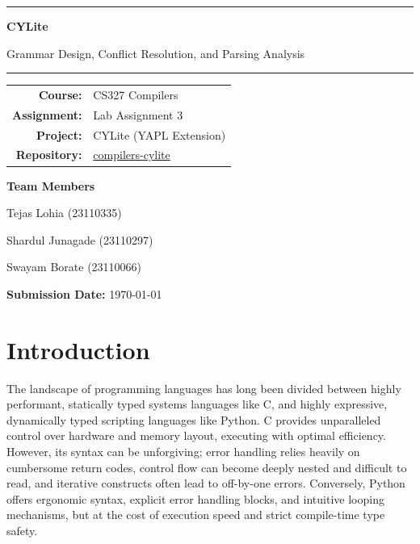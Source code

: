 \documentclass[a4paper,12pt]{article}
\begin{document}
\begin{titlepage}
    \centering
    \vspace*{1.2cm}

    \vspace{0.9cm}
    \rule{0.9\textwidth}{0.8pt}
    \vspace{0.6cm}

    {\Huge \textbf{CYLite} \par}
    \vspace{0.45cm}
    {\LARGE Grammar Design, Conflict Resolution, and Parsing Analysis \par}
    \vspace{0.6cm}

    \rule{0.9\textwidth}{0.8pt}

    \vspace{1.4cm}
    \begin{tabular}{rl}
        \textbf{Course:} & CS327 Compilers \\
        \textbf{Assignment:} & Lab Assignment 3 \\
        \textbf{Project:} & CYLite (YAPL Extension) \\
        \textbf{Repository:} & \href{https://github.com/ShardulJunagade/compilers-cylite}{compilers-cylite} \\
    \end{tabular}

    \vspace{1.4cm}
    {\Large \textbf{Team Members} \par}
    \vspace{0.4cm}
    {\large Tejas Lohia \hspace{0.4cm} (23110335) \par}
    {\large Shardul Junagade \hspace{0.4cm} (23110297) \par}
    {\large Swayam Borate \hspace{0.4cm} (23110066) \par}

    \vfill
    {\large \textbf{Submission Date:} \today \par}
\end{titlepage}

\tableofcontents
\newpage

\section{Introduction}

The landscape of programming languages has long been divided between highly performant, statically typed systems languages like C, and highly expressive, dynamically typed scripting languages like Python. C provides unparalleled control over hardware and memory layout, executing with optimal efficiency. However, its syntax can be unforgiving; error handling relies heavily on cumbersome return codes, control flow can become deeply nested and difficult to read, and iterative constructs often lead to off-by-one errors. Conversely, Python offers ergonomic syntax, explicit error handling blocks, and intuitive looping mechanisms, but at the cost of execution speed and strict compile-time type safety. 
\end{document}
